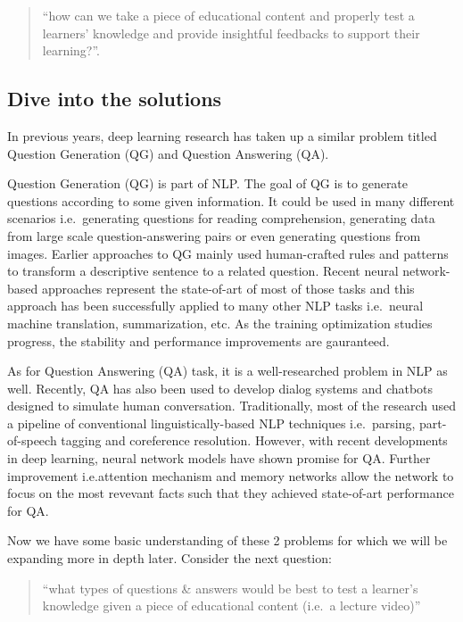 \documentclass[]{book}
\theoremstyle{definition}
\theoremstyle{definition}
\theoremstyle{definition}
\theoremstyle{remark}
\begin{document}
\begin{quote}
``how can we take a piece of educational content and properly test a
learners' knowledge and provide insightful feedbacks to support their
learning?''.
\end{quote}

\subsection{Dive into the solutions}\label{dive-into-the-solutions}

In previous years, deep learning research has taken up a similar problem
titled Question Generation (QG) and Question Answering (QA).

Question Generation (QG) is part of NLP. The goal of QG is to generate
questions according to some given information. It could be used in many
different scenarios i.e.~generating questions for reading comprehension,
generating data from large scale question-answering pairs or even
generating questions from images. Earlier approaches to QG mainly used
human-crafted rules and patterns to transform a descriptive sentence to
a related question. Recent neural network-based approaches represent the
state-of-art of most of those tasks and this approach has been
successfully applied to many other NLP tasks i.e.~neural machine
translation, summarization, etc. As the training optimization studies
progress, the stability and performance improvements are gauranteed.

As for Question Answering (QA) task, it is a well-researched problem in
NLP as well. Recently, QA has also been used to develop dialog systems
and chatbots designed to simulate human conversation. Traditionally,
most of the research used a pipeline of conventional
linguistically-based NLP techniques i.e.~parsing, part-of-speech tagging
and coreference resolution. However, with recent developments in deep
learning, neural network models have shown promise for QA. Further
improvement i.e.attention mechanism and memory networks allow the
network to focus on the most revevant facts such that they achieved
state-of-art performance for QA.

Now we have some basic understanding of these 2 problems for which we
will be expanding more in depth later. Consider the next question:

\begin{quote}
``what types of questions \& answers would be best to test a learner's
knowledge given a piece of educational content (i.e.~a lecture video)''
\end{quote}
\end{document}

